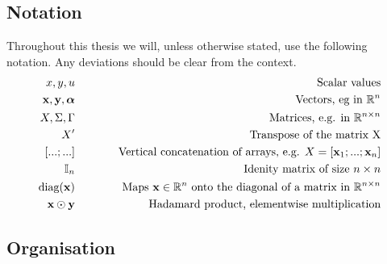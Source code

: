 \subsection{Notation}
Throughout this thesis we will, unless otherwise stated, use the following notation. Any deviations should be clear from the context.
\begin{eqnarray*}
    x, y, u & \hspace{1cm} & \text{Scalar values} \\
    {\bf x}, {\bf y}, {{\bm \alpha}} & \hspace{1cm} & \text{Vectors, eg in } \mathbb{R}^{n} \\
    X, \Sigma, \Gamma & \hspace{1cm} & \text{Matrices, e.g. in }\mathbb{R}^{n \times n} \\
    X' & \hspace{1cm} & \text{Transpose of the matrix X} \\
    \left[...;...\right] & \hspace{1cm} & \text{Vertical concatenation of arrays, e.g. } X = \left[{\bf x}_1;...; {\bf x}_n\right] \\
    \mathbb{I}_{n} & \hspace{1cm} & \text{Idenity matrix of size } n \times n \\
    \text{diag}({\bf x}) & \hspace{1cm} & \text{Maps } {\bf x} \in \mathbb{R}^{n} \text{ onto the diagonal of a matrix in }\mathbb{R}^{n\times{}n} \\
    {\bf x} \odot {\bf y} & \hspace{1cm} & \text{Hadamard product, elementwise multiplication} \\
\end{eqnarray*}

\subsection{Organisation}

